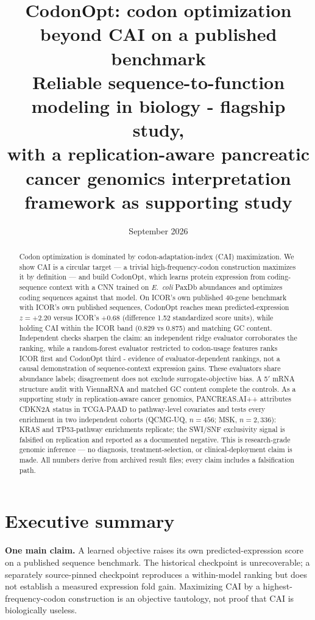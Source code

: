 \documentclass[11pt]{article}
\title{CodonOpt: codon optimization beyond CAI on a published benchmark\\{\large Reliable sequence-to-function modeling in biology - flagship study,\\with a replication-aware pancreatic cancer genomics interpretation framework as supporting study}}
\date{September 2026}
\begin{document}
\maketitle
\begin{abstract}
Codon optimization is dominated by codon-adaptation-index (CAI) maximization. We show CAI is a circular target --- a trivial high-frequency-codon construction maximizes it by definition --- and build CodonOpt, which learns protein expression from coding-sequence context with a CNN trained on \emph{E.~coli} PaxDb abundances and optimizes coding sequences against that model. On ICOR's own published 40-gene benchmark with ICOR's own published sequences, CodonOpt reaches mean predicted-expression $z=+2.20$ versus ICOR's $+0.68$ (difference 1.52 standardized score units), while holding CAI within the ICOR band (0.829 vs 0.875) and matching GC content. Independent checks sharpen the claim: an independent ridge evaluator corroborates the ranking, while a random-forest evaluator restricted to codon-usage features ranks ICOR first and CodonOpt third - evidence of evaluator-dependent rankings, not a causal demonstration of sequence-context expression gains. These evaluators share abundance labels; disagreement does not exclude surrogate-objective bias. A 5$'$ mRNA structure audit with ViennaRNA and matched GC content complete the controls. As a supporting study in replication-aware cancer genomics, PANCREAS.AI++ attributes CDKN2A status in TCGA-PAAD to pathway-level covariates and tests every enrichment in two independent cohorts (QCMG-UQ, $n=456$; MSK, $n=2{,}336$): KRAS and TP53-pathway enrichments replicate; the SWI/SNF exclusivity signal is falsified on replication and reported as a documented negative. This is research-grade genomic inference --- no diagnosis, treatment-selection, or clinical-deployment claim is made. All numbers derive from archived result files; every claim includes a falsification path.
\end{abstract}

\section*{Executive summary}
\textbf{One main claim.} A learned objective raises its own predicted-expression score on a published sequence benchmark. The historical checkpoint is unrecoverable; a separately source-pinned checkpoint reproduces a within-model ranking but does not establish a measured expression fold gain. Maximizing CAI by a highest-frequency-codon construction is an objective tautology, not proof that CAI is biologically useless.
\end{document}
